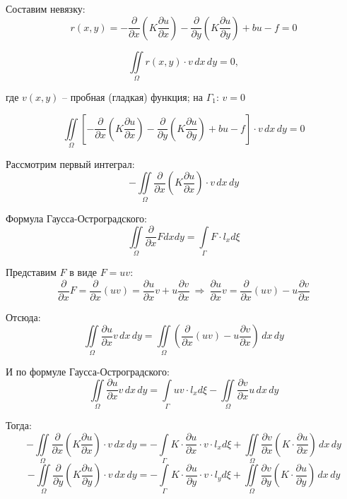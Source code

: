 \documentclass{bmstu}
\begin{document}
	
	Составим невязку:
	\[r(x, y) = -\frac{\partial}{\partial x} \left( K \frac{\partial u}{\partial x} \right) -\frac{\partial}{\partial y} \left( K \frac{\partial u}{\partial y} \right) + bu - f = 0\]
	
	\[\iint\limits_{\Omega} r(x, y) \cdot v \, dx \, dy = 0,\]
	
	где $v(x, y)$ -- пробная (гладкая) функция; на $\Gamma_1$: $v = 0$
	
	\begin{equation}\label{iint}
	\iint\limits_{\Omega} \left [ -\frac{\partial}{\partial x} \left( K \frac{\partial u}{\partial x} \right) -\frac{\partial}{\partial y} \left( K \frac{\partial u}{\partial y} \right) + bu - f \right ] \cdot v \, dx \, dy = 0
	\end{equation}
	
	Рассмотрим первый интеграл:
	\[-\iint\limits_{\Omega} \frac{\partial}{\partial x} \left( K \frac{\partial u}{\partial x} \right) \cdot v \, dx \, dy\]
	
	Формула Гаусса-Остроградского:
	\[\iint\limits_{\Omega} \frac{\partial}{\partial x} F dx dy = \int \limits_{\Gamma} F \cdot l_x d \xi\]
	
	Представим $F$ в виде $F = uv$:
	\[\frac{\partial}{\partial x} F = \frac{\partial}{\partial x} (uv) = \frac{\partial u}{\partial x} v + u \frac{\partial v}{\partial x}\ \Rightarrow\ 
	\frac{\partial u}{\partial x} v = \frac{\partial}{\partial x} (uv) - u \frac{\partial v}{\partial x}\]
	
	Отсюда:
	\[\iint\limits_{\Omega} \frac{\partial u}{\partial x} v \, dx \, dy = \iint\limits_{\Omega} \left( \frac{\partial}{\partial x} (uv) - u \frac{\partial v}{\partial x} \right) \, dx \, dy\]
	
	И по формуле Гаусса-Остроградского:
	\[\iint\limits_{\Omega} \frac{\partial u}{\partial x} v \, dx \, dy = \int \limits_{\Gamma} uv \cdot l_x d \xi - \iint\limits_{\Omega} \frac{\partial v}{\partial x} u \, dx \, dy\]
	
	Тогда:
	\[-\iint\limits_{\Omega} \frac{\partial}{\partial x} \left( K \frac{\partial u}{\partial x} \right) \cdot v \, dx \, dy = 
	-\int \limits_{\Gamma} K \cdot \frac{\partial u}{\partial x} \cdot v \cdot l_x d \xi + \iint\limits_{\Omega} \frac{\partial v}{\partial x} \left(  K \cdot \frac{\partial u}{\partial x} \right) \, dx \, dy\]
	\[-\iint\limits_{\Omega} \frac{\partial}{\partial y} \left( K \frac{\partial u}{\partial y} \right) \cdot v \, dx \, dy = 
	-\int \limits_{\Gamma} K \cdot \frac{\partial u}{\partial y} \cdot v \cdot l_y d \xi + \iint\limits_{\Omega} \frac{\partial v}{\partial y} \left(  K \cdot \frac{\partial u}{\partial y} \right) \, dx \, dy\]
	
\end{document}
